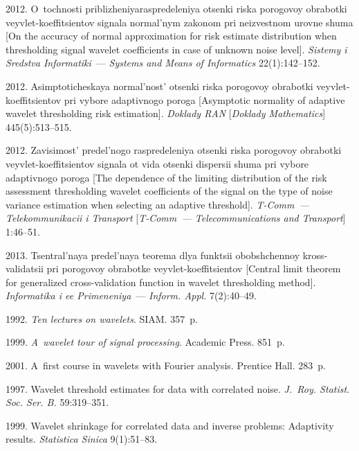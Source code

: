 \begin{multicols}{2}
{{\begin{thebibliography}{99}
2012. O~tochnosti priblizheniya\linebreak raspredeleniya otsenki riska porogovoy 
obrabotki veyvlet-koeffitsientov
signala normal'nym zakonom pri neizvestnom urovne shuma 
[On the accuracy of normal approximation for risk estimate distribution when 
thresholding signal wavelet coefficients in case of unknown noise level]. 
\textit{Sistemy i Sredstva Informatiki}~--- \textit{Systems and Means of Informatics}
22(1):142--152.

2012. Asimptoticheskaya normal'nost' otsenki riska porogovoy obrabotki veyvlet-koeffitsientov pri vybore
adaptivnogo poroga [Asymptotic normality of adaptive wavelet thresholding risk estimation].
\textit{Doklady RAN} [\textit{Doklady Mathematics}] 445(5):513--515.

2012. Zavisimost' predel'nogo ras\-pre\-de\-leniya otsenki riska porogovoy obrabotki 
veyvlet-koef\-fit\-si\-entov signala
ot vida otsenki dispersii shuma pri vybore adaptivnogo poroga 
[The dependence of the limiting distribution of the risk assessment thresholding 
wavelet coefficients of the signal on the type of noise variance estimation 
when selecting an adaptive threshold]. \textit{T-Comm~--- Telekommunikacii i Transport} 
[\textit{T-Comm~--- Telecommunications and Transport}] 1:46--51.

2013. Tsentral'naya predel'naya teorema dlya funktsii obobshchennoy 
kross-validatsii pri po\-ro\-go\-voy obrabotke veyvlet-koeffitsientov 
[Central limit theorem for generalized cross-validation function in wavelet 
thresholding method]. \textit{Informatika i ee Primeneniya}~--- 
\textit{Inform. Appl.} 7(2):40--49.

 1992. \textit{Ten lectures on wavelets}. SIAM. 357~p.

 1999. \textit{A~wavelet tour of signal processing}. Academic Press.
851~p.

2001. A~first course in wavelets with Fourier analysis. Prentice Hall. 283~p.

1997. Wavelet threshold estimates for data with correlated noise.
\textit{J.~Roy. Statist. Soc. Ser. B.} 59:319--351.

1999. Wavelet shrinkage for correlated data and inverse problems: Adaptivity
results. \textit{Statistica Sinica} 9(1):51--83.


\end{thebibliography}}}
\end{multicols}
